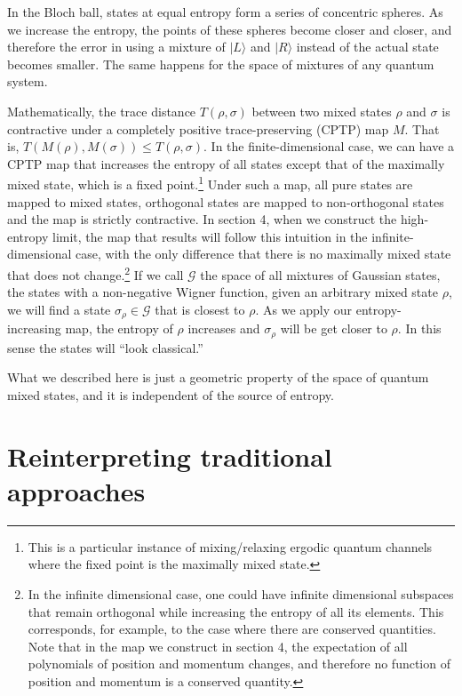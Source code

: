 \documentclass{article}
\def\>{\rangle}
\begin{document}
In the Bloch ball, states at equal entropy form a series of concentric spheres. As we increase the entropy, the points of these spheres become closer and closer, and therefore the error in using a mixture of $|L\>$ and $|R\>$ instead of the actual state becomes smaller. The same happens for the space of mixtures of any quantum system.

Mathematically, the trace distance $T(\rho,\sigma)$ between two mixed states $\rho$ and $\sigma$ is contractive under a completely positive trace-preserving (CPTP) map $M$. That is, $T(M(\rho),M(\sigma)) \leq T(\rho,\sigma)$.\cite{nielsen2010quantum} In the finite-dimensional case, we can have a CPTP map that increases the entropy of all states except that of the maximally mixed state, which is a fixed point.\footnote{This is a particular instance of mixing/relaxing ergodic quantum channels where the fixed point is the maximally mixed state\cite{Burgarth2012ErgodicAM}.}  Under such a map, all pure states are mapped to mixed states, orthogonal states are mapped to non-orthogonal states and the map is strictly contractive. In section 4, when we construct the high-entropy limit, the map that results will follow this intuition in the infinite-dimensional case, with the only difference that there is no maximally mixed state that does not change.\footnote{In the infinite dimensional case, one could have infinite dimensional subspaces that remain orthogonal while increasing the entropy of all its elements. This corresponds, for example, to the case where there are conserved quantities. Note that in the map we construct in section 4, the expectation of all polynomials of position and momentum changes, and therefore no function of position and momentum is a conserved quantity. }  If we call $\mathcal{G}$ the space of all mixtures of Gaussian states, the states with a non-negative Wigner function, given an arbitrary mixed state $\rho$, we will find a state $\sigma_{\rho} \in \mathcal{G}$ that is closest to $\rho$. As we apply our entropy-increasing map, the entropy of $\rho$ increases and $\sigma_{\rho}$ will be get closer to $\rho$. In this sense the states will ``look classical.''

What we described here is just a geometric property of the space of quantum mixed states, and it is independent of the source of entropy.

\section{Reinterpreting traditional approaches}
\end{document}
